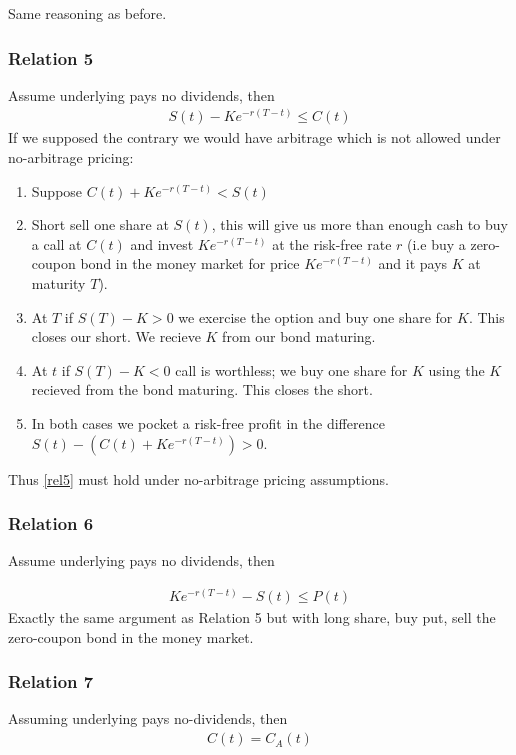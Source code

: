 \documentclass[9pt]{extarticle}
\begin{document}
Same reasoning as before.

\subsubsection{Relation 5}

Assume underlying pays no dividends, then
\begin{align}\label{rel5}
  S(t) - Ke^{-r(T-t)} \leq C(t)
\end{align}
If we supposed the contrary we would have arbitrage which is not allowed under no-arbitrage pricing:
\begin{enumerate}
  \item Suppose $C(t) + Ke^{-r(T-t)}<S(t)$
  \item Short sell one share at $S(t)$, this will give us more than enough cash to buy a call at $C(t)$ and 
  invest $Ke^{-r(T-t)}$ at the risk-free rate $r$ (i.e buy a zero-coupon bond in the money market for price $Ke^{-r(T-t)}$ and it pays $K$ at maturity $T$).
  \item At $T$ if $S(T)-K>0$ we exercise the option and buy one share for $K$. This closes our short. We recieve $K$ from our bond maturing. 
  \item At $t$ if $S(T)-K <0$ call is worthless; we buy one share for $K$ using the $K$ recieved from the bond maturing. This closes the short.
  \item In both cases we pocket a risk-free profit in the difference $S(t)- (C(t)+Ke^{-r(T-t)})>0$.  
\end{enumerate}
Thus \eqref{rel5} must hold under no-arbitrage pricing assumptions.

\subsubsection{Relation 6}

Assume underlying pays no dividends, then

\begin{align}
 Ke^{-r(T-t)} -  S(t)  \leq P(t)
\end{align}
Exactly the same argument as Relation 5 but with long share, buy put, sell the zero-coupon bond in the money market. 

\subsubsection{Relation 7}

Assuming underlying pays no-dividends, then
\begin{align}\label{callp}
   C(t) = C_A(t)
\end{align}
\end{document}
